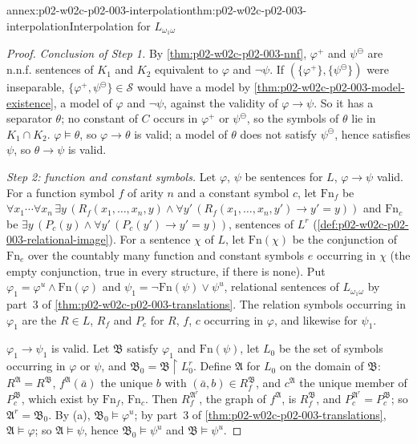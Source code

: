 \begin{annexitem}{annex:p02-w02c-p02-003-interpolation}{thm:p02-w02c-p02-003-interpolation}{Interpolation for \(L_{\omega_1\omega}\)}
\begin{proof}
\emph{Conclusion of Step 1.}  By \cref{thm:p02-w02c-p02-003-nnf},
\(\varphi^{+}\) and \(\psi^{\ominus}\) are n.n.f. sentences of \(K_1\) and
\(K_2\) equivalent to \(\varphi\) and \(\neg\psi\).  If
\((\{\varphi^{+}\},\{\psi^{\ominus}\})\) were inseparable,
\(\{\varphi^{+},\psi^{\ominus}\}\in\mathcal S\) would have a model by
\cref{thm:p02-w02c-p02-003-model-existence}, a model of \(\varphi\) and
\(\neg\psi\), against the validity of \(\varphi\to\psi\).  So it has a
separator \(\theta\); no constant of \(C\) occurs in \(\varphi^{+}\) or
\(\psi^{\ominus}\), so the symbols of \(\theta\) lie in \(K_1\cap K_2\).
\(\varphi\models\theta\), so \(\varphi\to\theta\) is valid; a model of
\(\theta\) does not satisfy \(\psi^{\ominus}\), hence satisfies \(\psi\), so
\(\theta\to\psi\) is valid.

\emph{Step 2: function and constant symbols.}  Let \(\varphi\), \(\psi\) be
sentences for \(L\), \(\varphi\to\psi\) valid.  For a function symbol
\(f\) of arity \(n\) and a constant symbol \(c\), let \(\mathrm{Fn}_f\) be
\(\forall x_1\cdots\forall x_n\,\exists y\,(R_f(x_1,\ldots,x_n,y)\land
\forall y'\,(R_f(x_1,\ldots,x_n,y')\to y'=y))\) and \(\mathrm{Fn}_c\) be
\(\exists y\,(P_c(y)\land\forall y'\,(P_c(y')\to y'=y))\), sentences of
\(L^{r}\) (\cref{def:p02-w02c-p02-003-relational-image}).  For a sentence
\(\chi\) of \(L\), let \(\mathrm{Fn}(\chi)\) be the conjunction of
\(\mathrm{Fn}_e\) over the countably many function and constant symbols
\(e\) occurring in \(\chi\) (the empty conjunction, true in every
structure, if there is none).  Put \(\varphi_1=\varphi^{u}\land
\mathrm{Fn}(\varphi)\) and \(\psi_1=\neg\mathrm{Fn}(\psi)\lor\psi^{u}\),
relational sentences of \(L_{\omega_1\omega}\) by part~3 of
\cref{thm:p02-w02c-p02-003-translations}.  The relation symbols occurring
in \(\varphi_1\) are the \(R\in L\), \(R_f\) and \(P_c\) for \(R\), \(f\),
\(c\) occurring in \(\varphi\), and likewise for \(\psi_1\).

\(\varphi_1\to\psi_1\) is valid.  Let \(\mathfrak B\) satisfy \(\varphi_1\)
and \(\mathrm{Fn}(\psi)\), let \(L_0\) be the set of symbols occurring in
\(\varphi\) or \(\psi\), and \(\mathfrak B_0=\mathfrak B\restriction
L_0^{r}\).  Define \(\mathfrak A\) for \(L_0\) on the domain of
\(\mathfrak B\): \(R^{\mathfrak A}=R^{\mathfrak B}\),
\(f^{\mathfrak A}(\bar a)\) the unique \(b\) with
\((\bar a,b)\in R_f^{\mathfrak B}\), and \(c^{\mathfrak A}\) the unique
member of \(P_c^{\mathfrak B}\), which exist by \(\mathrm{Fn}_f\),
\(\mathrm{Fn}_c\).  Then \(R_f^{\mathfrak A^{r}}\), the graph of
\(f^{\mathfrak A}\), is \(R_f^{\mathfrak B}\), and
\(P_c^{\mathfrak A^{r}}=P_c^{\mathfrak B}\); so \(\mathfrak A^{r}=\mathfrak
B_0\).  By (a), \(\mathfrak B_0\models\varphi^{u}\); by part~3 of
\cref{thm:p02-w02c-p02-003-translations},
\(\mathfrak A\models\varphi\); so \(\mathfrak A\models\psi\), hence
\(\mathfrak B_0\models\psi^{u}\) and \(\mathfrak B\models\psi^{u}\).


\end{proof}
\end{annexitem}
